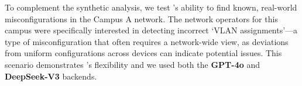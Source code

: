 

To complement the synthetic analysis, we test \sysname{}'s ability to find known, real-world misconfigurations in the Campus A network. The network operators for this campus were specifically interested in detecting incorrect `VLAN assignments'—a type of misconfiguration that often requires a network-wide view, as deviations from uniform configurations across devices can indicate potential issues.
 This scenario demonstrates \sysname{}'s flexibility and we used both the \textbf{GPT-4o} and \textbf{DeepSeek-V3} backends.
 
 
